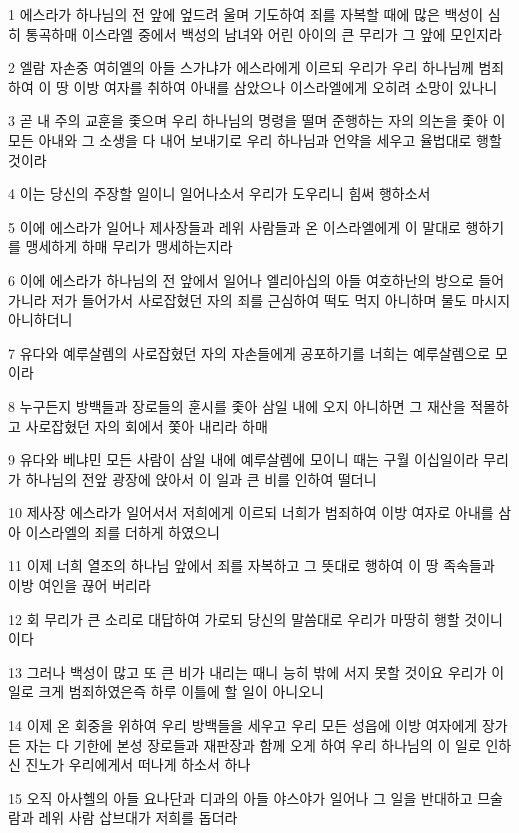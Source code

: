 \par 1 에스라가 하나님의 전 앞에 엎드려 울며 기도하여 죄를 자복할 때에 많은 백성이 심히 통곡하매 이스라엘 중에서 백성의 남녀와 어린 아이의 큰 무리가 그 앞에 모인지라
\par 2 엘람 자손중 여히엘의 아들 스가냐가 에스라에게 이르되 우리가 우리 하나님께 범죄하여 이 땅 이방 여자를 취하여 아내를 삼았으나 이스라엘에게 오히려 소망이 있나니
\par 3 곧 내 주의 교훈을 좇으며 우리 하나님의 명령을 떨며 준행하는 자의 의논을 좇아 이 모든 아내와 그 소생을 다 내어 보내기로 우리 하나님과 언약을 세우고 율법대로 행할 것이라
\par 4 이는 당신의 주장할 일이니 일어나소서 우리가 도우리니 힘써 행하소서
\par 5 이에 에스라가 일어나 제사장들과 레위 사람들과 온 이스라엘에게 이 말대로 행하기를 맹세하게 하매 무리가 맹세하는지라
\par 6 이에 에스라가 하나님의 전 앞에서 일어나 엘리아십의 아들 여호하난의 방으로 들어가니라 저가 들어가서 사로잡혔던 자의 죄를 근심하여 떡도 먹지 아니하며 물도 마시지 아니하더니
\par 7 유다와 예루살렘의 사로잡혔던 자의 자손들에게 공포하기를 너희는 예루살렘으로 모이라
\par 8 누구든지 방백들과 장로들의 훈시를 좇아 삼일 내에 오지 아니하면 그 재산을 적몰하고 사로잡혔던 자의 회에서 쫓아 내리라 하매
\par 9 유다와 베냐민 모든 사람이 삼일 내에 예루살렘에 모이니 때는 구월 이십일이라 무리가 하나님의 전앞 광장에 앉아서 이 일과 큰 비를 인하여 떨더니
\par 10 제사장 에스라가 일어서서 저희에게 이르되 너희가 범죄하여 이방 여자로 아내를 삼아 이스라엘의 죄를 더하게 하였으니
\par 11 이제 너희 열조의 하나님 앞에서 죄를 자복하고 그 뜻대로 행하여 이 땅 족속들과 이방 여인을 끊어 버리라
\par 12 회 무리가 큰 소리로 대답하여 가로되 당신의 말씀대로 우리가 마땅히 행할 것이니이다
\par 13 그러나 백성이 많고 또 큰 비가 내리는 때니 능히 밖에 서지 못할 것이요 우리가 이 일로 크게 범죄하였은즉 하루 이틀에 할 일이 아니오니
\par 14 이제 온 회중을 위하여 우리 방백들을 세우고 우리 모든 성읍에 이방 여자에게 장가든 자는 다 기한에 본성 장로들과 재판장과 함께 오게 하여 우리 하나님의 이 일로 인하신 진노가 우리에게서 떠나게 하소서 하나
\par 15 오직 아사헬의 아들 요나단과 디과의 아들 야스야가 일어나 그 일을 반대하고 므술람과 레위 사람 삽브대가 저희를 돕더라
